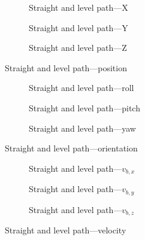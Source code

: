 \begin{figure}[H]
    \centering
    \begin{subfigure}{0.3\textwidth}
        
        \caption{Straight and level path---X}
    \end{subfigure}
    \hfill
    \begin{subfigure}{0.3\textwidth}
        
        \caption{Straight and level path---Y}
    \end{subfigure}
    \hfill
    \begin{subfigure}{0.3\textwidth}
        
        \caption{Straight and level path---Z}
    \end{subfigure}
    \caption{Straight and level path---position}\label{fig:straight-level-pos}
\end{figure}

\begin{figure}[H]
    \centering
    \begin{subfigure}{0.3\textwidth}
        
        \caption{Straight and level path---roll}
    \end{subfigure}
    \hfill
    \begin{subfigure}{0.3\textwidth}
        
        \caption{Straight and level path---pitch}
    \end{subfigure}
    \hfill
    \begin{subfigure}{0.3\textwidth}
        
        \caption{Straight and level path---yaw}
    \end{subfigure}
    \caption{Straight and level path---orientation}\label{fig:straight-level-ori}
\end{figure}

\begin{figure}[H]
    \centering
    \begin{subfigure}{0.3\textwidth}
        
        \caption{Straight and level path---$v_{b,x}$}
    \end{subfigure}
    \hfill
    \begin{subfigure}{0.3\textwidth}
        
        \caption{Straight and level path---$v_{b,y}$}
    \end{subfigure}
    \hfill
    \begin{subfigure}{0.3\textwidth}
        
        \caption{Straight and level path---$v_{b,z}$}
    \end{subfigure}
    \caption{Straight and level path---velocity}\label{fig:straight-level-vel}
\end{figure}

